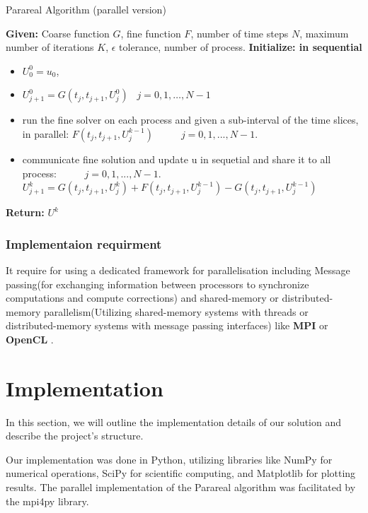 \documentclass[a4paper,12pt,french]{article}
\begin{document}
\begin{algorithm}
\caption{Parareal Algorithm (parallel version)} 
\begin{algorithmic}[1]
\STATE \textbf{Given:} Coarse function $G$, fine function $F$, number of time steps $N$, maximum number of iterations $K$, $\epsilon$ tolerance, number of process.
\STATE \textbf{Initialize: in sequential} \begin{itemize}
    \item  $U_0^0 = u_0$,
    \item $ U_{j+1}^0 = G(t_j,t_{j+1}, U_j^0) \;\;\;j = 0,1, \ldots, N-1$
\end{itemize}
    \begin{itemize}
        \item run the fine solver on each process and given a sub-interval of the time slices, in parallel: $F(t_j,t_{j+1}, U_j^{k-1}) \;\;\;\;\;\;\;\;\;\; j = 0,1, ... ,N-1$.
        \item  communicate fine solution and update u in sequetial and share it to all process: $\;\;\;\;\;\;\;\;\; j = 0,1, ... ,N-1$.
        \newline
        $ U_{j+1}^k = G(t_j,t_{j+1},U_j^k) + F(t_j,t_{j+1},U_j^{k-1}) -G(t_j,t_{j+1},U_j^{k-1})$
    \end{itemize}
\ENDWHILE
\STATE \textbf{Return:} $U^k$
\end{algorithmic}
\end{algorithm}
\newpage
\subsubsection*{Implementaion requirment}
It require for using a dedicated framework for parallelisation including Message passing(for exchanging information between processors to synchronize computations and compute corrections) and shared-memory or distributed-memory parallelism(Utilizing shared-memory systems with threads or distributed-memory systems with message passing interfaces) like \textbf{MPI} \cite{forum1994mpi} or \textbf{OpenCL} \cite{munshi2011opencl}.

\newpage
\section{Implementation}
In this section, we will outline the implementation details of our solution and describe the project's structure.

Our implementation was done in Python, utilizing libraries like NumPy for numerical operations, SciPy for scientific computing, and Matplotlib for plotting results. The parallel implementation of the Parareal algorithm was facilitated by the mpi4py library.
\end{document}
